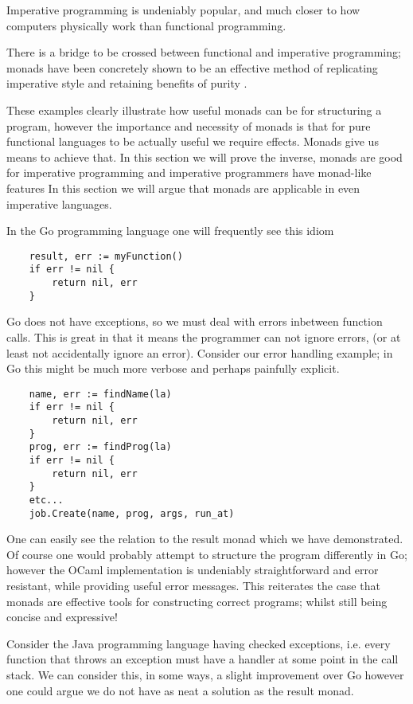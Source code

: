 Imperative programming is undeniably popular,
and much closer to how computers physically work than functional programming.



There is a bridge to be crossed between functional and imperative programming;
monads have been concretely shown to be an effective method of replicating
imperative style and retaining benefits of purity \cite{PeytonJones:1993}.

These examples clearly illustrate how useful monads can be for structuring a program,
however the importance and necessity of monads is that for pure functional languages
to be actually useful we require effects. Monads give us means to achieve that.
In this section we will prove the inverse,
monads are good for imperative programming
and imperative programmers have monad-like features
In this section we will argue that monads are applicable
in even imperative languages.




In the Go programming language one will frequently see this idiom
\begin{verbatim}
    result, err := myFunction()
    if err != nil {
        return nil, err
    }
\end{verbatim}

Go does not have exceptions,
so we must deal with errors inbetween function calls.
This is great in that it means the programmer can not
ignore errors, (or at least not accidentally ignore an error).
Consider our error handling example;
in Go this might be much more verbose
and perhaps painfully explicit.

\begin{verbatim}
    name, err := findName(la)
    if err != nil {
        return nil, err
    }
    prog, err := findProg(la)
    if err != nil {
        return nil, err
    }
    etc...
    job.Create(name, prog, args, run_at)
\end{verbatim}

One can easily see the relation to the result monad which we have demonstrated.
Of course one would probably attempt to structure the program differently in Go;
however the OCaml implementation is undeniably straightforward
and error resistant, while providing useful error messages.
This reiterates the case that monads are effective tools
for constructing correct programs;
whilst still being concise and expressive!

Consider the Java programming language having checked exceptions,
i.e. every function that throws an exception must have a handler
at some point in the call stack.
We can consider this, in some ways, a slight improvement
over Go however one could argue we do not have as neat a solution
as the result monad.

